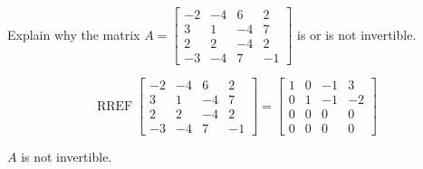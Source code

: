 
\begin{exerciseStatement}


Explain why the matrix \(A= \left[\begin{array}{cccc}
-2 & -4 & 6 & 2 \\
3 & 1 & -4 & 7 \\
2 & 2 & -4 & 2 \\
-3 & -4 & 7 & -1
\end{array}\right] \) is or is not invertible.


\end{exerciseStatement}
    
\begin{exerciseAnswer} 


\[\operatorname{RREF} \left[\begin{array}{cccc}
-2 & -4 & 6 & 2 \\
3 & 1 & -4 & 7 \\
2 & 2 & -4 & 2 \\
-3 & -4 & 7 & -1
\end{array}\right] = \left[\begin{array}{cccc}
1 & 0 & -1 & 3 \\
0 & 1 & -1 & -2 \\
0 & 0 & 0 & 0 \\
0 & 0 & 0 & 0
\end{array}\right] \]

\(A\) is not invertible.
\end{exerciseAnswer}
    
